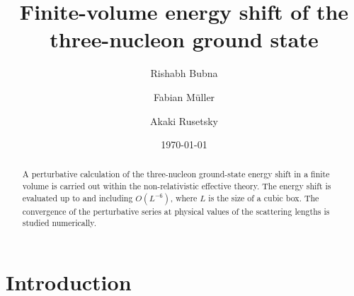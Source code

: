 \documentclass[12pt,prd,tightenlines,nofootinbib]{revtex4-2}
\begin{document}

\title{Finite-volume energy shift of the three-nucleon ground state}

\author{Rishabh Bubna}
\author{Fabian M\"uller}
 \author{Akaki Rusetsky}


\date{\today}

\begin{abstract}

  A perturbative calculation of the three-nucleon ground-state energy shift in a finite volume
  is carried out within the non-relativistic effective theory. The energy shift is evaluated
  up to and including $O(L^{-6})$, where $L$ is the size of a cubic box. The convergence
  of the perturbative series at physical values of the scattering lengths is studied numerically.

\end{abstract}

\maketitle

\section{Introduction}
\end{document}
